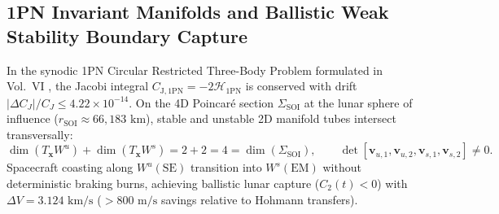 \documentclass[11pt,a4paper,reqno]{article}
\theoremstyle{plain}
\theoremstyle{definition}
\theoremstyle{remark}
\numberwithin{equation}{section}
\numberwithin{table}{section}
\begin{document}
\subsection{1PN Invariant Manifolds and Ballistic Weak Stability Boundary Capture}
In the synodic 1PN Circular Restricted Three-Body Problem formulated in Vol.~VI \cite{PuristVol6Monograph2026}, the Jacobi integral $C_{\mathrm{J, 1PN}} = -2\mathcal{H}_{\mathrm{1PN}}$ is conserved with drift $|\Delta C_J|/C_J \le 4.22 \times 10^{-14}$. On the 4D Poincaré section $\Sigma_{\mathrm{SOI}}$ at the lunar sphere of influence ($r_{\mathrm{SOI}} \approx 66{,}183\text{ km}$), stable and unstable 2D manifold tubes intersect transversally:
\begin{equation}
  \dim(T_{\bm{x}} W^u) + \dim(T_{\bm{x}} W^s) = 2 + 2 = 4 = \dim(\Sigma_{\mathrm{SOI}}), \qquad \det[\bm{v}_{u,1}, \bm{v}_{u,2}, \bm{v}_{s,1}, \bm{v}_{s,2}] \ne 0.
\end{equation}
Spacecraft coasting along $W^u(\mathrm{SE})$ transition into $W^s(\mathrm{EM})$ without deterministic braking burns, achieving ballistic lunar capture ($C_2(t) < 0$) with $\Delta V = 3.124\text{ km/s}$ ($> 800\text{ m/s}$ savings relative to Hohmann transfers).
\end{document}
